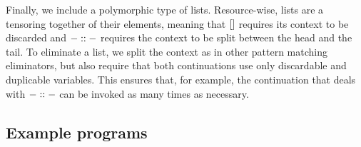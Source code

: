 Finally, we include a polymorphic type of lists.
Resource-wise, lists are a tensoring together of their elements, meaning that
$[]$ requires its context to be discarded and $- :: -$ requires the
context to be split between the head and the tail.
To eliminate a list, we split the context as in other pattern matching
eliminators, but also require that both continuations use only discardable
and duplicable variables.
This ensures that, for example, the continuation that deals with $- :: -$
can be invoked as many times as necessary.



\subsection{Example programs}

